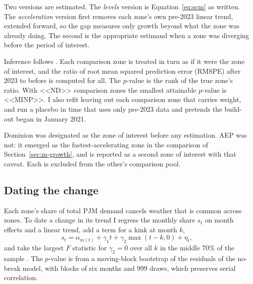 \documentclass[11pt,a4paper]{article}
\begin{document}
Two versions are estimated. The \emph{levels} version is Equation~\eqref{eq:scm} as written. The \emph{acceleration} version first removes each zone's own pre-2023 linear trend, extended forward, so the gap measures only growth beyond what the zone was already doing. The second is the appropriate estimand when a zone was diverging before the period of interest.

Inference follows \cite{adh2010}. Each comparison zone is treated in turn as if it were the zone of interest, and the ratio of root mean squared prediction error (RMSPE) after 2023 to before is computed for all. The $p$-value is the rank of the true zone's ratio. With <<ND>> comparison zones the smallest attainable $p$-value is <<MINP>>. I also refit leaving out each comparison zone that carries weight, and run a placebo in time that uses only pre-2023 data and pretends the build-out began in January 2021.

Dominion was designated as the zone of interest before any estimation. AEP was not: it emerged as the fastest-accelerating zone in the comparison of Section~\ref{sec:m-growth}, and is reported as a second zone of interest with that caveat. Each is excluded from the other's comparison pool.

\subsection{Dating the change}
Each zone's share of total PJM demand cancels weather that is common across zones. To date a change in its trend I regress the monthly share $s_t$ on month effects and a linear trend, add a term for a kink at month $k$,
\begin{equation}
s_t = \alpha_{m(t)} + \gamma_1 t + \gamma_2 \max(t-k, 0) + \eta_t ,
\end{equation}
and take the largest $F$ statistic for $\gamma_2 = 0$ over all $k$ in the middle 70\% of the sample \cite{andrews}. The $p$-value is from a moving-block bootstrap \cite{kunsch} of the residuals of the no-break model, with blocks of six months and 999 draws, which preserves serial correlation.
\end{document}
